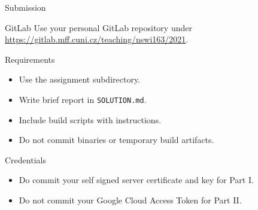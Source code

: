 \begin{frame}{Submission}
    \begin{block}{GitLab}
        Use your personal GitLab repository under \\
        \url{https://gitlab.mff.cuni.cz/teaching/nswi163/2021}.
    \end{block}
    \begin{block}{Requirements}
        \begin{itemize}
            \item Use the assignment subdirectory.
            \item Write brief report in \lstinline{SOLUTION.md}.
            \item Include build scripts with instructions.
            \item Do not commit binaries or temporary build artifacts.
        \end{itemize}
    \end{block}
    \begin{block}{Credentials}
        \begin{itemize}
            \item Do commit your self signed server certificate and key for Part I.
            \item Do not commit your Google Cloud Access Token for Part II.
        \end{itemize}
    \end{block}
\end{frame}



